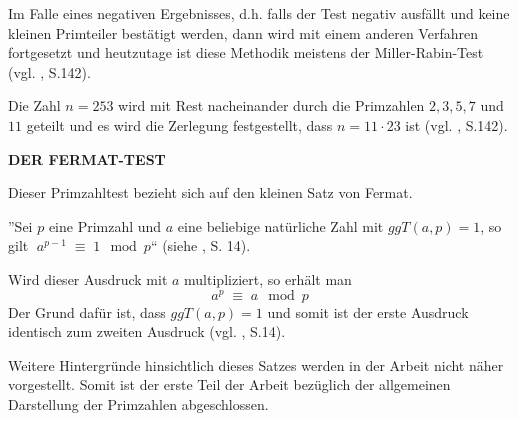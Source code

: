 Im Falle eines negativen Ergebnisses, d.h. falls der Test
negativ ausfällt und keine kleinen Primteiler bestätigt
werden, dann wird mit einem anderen Verfahren fortgesetzt
und heutzutage ist diese Methodik meistens der 
Miller-Rabin-Test (vgl. \cite{karpfingerkiechle}, S.142).

\begin{example}
Die Zahl $n = 253$ wird mit Rest nacheinander durch die
Primzahlen $2, 3, 5, 7$ und $11$ geteilt und es wird die
Zerlegung festgestellt, dass $n = 11\cdot 23$ ist
(vgl. \cite{karpfingerkiechle}, S.142).
\end{example}
\vspace{.3cm}


\textbf{DER FERMAT-TEST}

Dieser Primzahltest bezieht sich auf den kleinen Satz
von Fermat.
\begin{theorem}
''Sei $p$ eine Primzahl und $a$ eine beliebige
natürliche Zahl mit $ggT(a,p)=1$, so gilt
$\; a^{p-1} \;\equiv\; 1\mod p$“
(siehe \cite{sasgabor}, S. 14).
\end{theorem}

Wird dieser Ausdruck mit $a$ multipliziert, so erhält man
\[
 a^p \;\equiv\; a \mod p
\]
Der Grund dafür ist, dass $ggT(a,p)=1$ und somit ist der
erste Ausdruck identisch zum zweiten Ausdruck
(vgl. \cite{sasgabor}, S.14).

Weitere Hintergründe hinsichtlich dieses Satzes werden
in der Arbeit nicht näher vorgestellt.
Somit ist der erste Teil der Arbeit bezüglich der
allgemeinen Darstellung der Primzahlen abgeschlossen.
